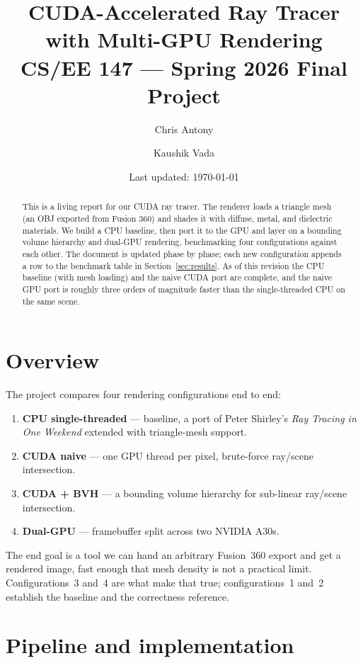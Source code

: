 \documentclass[11pt]{article}
\title{\textbf{CUDA-Accelerated Ray Tracer with Multi-GPU Rendering}\\[4pt]
       \large CS/EE 147 --- Spring 2026 Final Project}
\author{Chris Antony \and Kaushik Vada}
\date{Last updated: \today}
\begin{document}
\maketitle

\begin{abstract}
This is a living report for our CUDA ray tracer. The renderer loads a triangle mesh
(an OBJ exported from Fusion 360) and shades it with diffuse, metal, and dielectric
materials. We build a CPU baseline, then port it to the GPU and layer on a bounding
volume hierarchy and dual-GPU rendering, benchmarking four configurations against
each other. The document is updated phase by phase; each new configuration appends a
row to the benchmark table in Section~\ref{sec:results}. As of this revision the CPU
baseline (with mesh loading) and the naive CUDA port are complete, and the naive GPU
port is roughly three orders of magnitude faster than the single-threaded CPU on the
same scene.
\end{abstract}

\section{Overview}

The project compares four rendering configurations end to end:

\begin{enumerate}
  \item \textbf{CPU single-threaded} --- baseline, a port of Peter Shirley's
        \emph{Ray Tracing in One Weekend} extended with triangle-mesh support.
  \item \textbf{CUDA naive} --- one GPU thread per pixel, brute-force ray/scene
        intersection.
  \item \textbf{CUDA + BVH} --- a bounding volume hierarchy for sub-linear
        ray/scene intersection.
  \item \textbf{Dual-GPU} --- framebuffer split across two NVIDIA A30s.
\end{enumerate}

The end goal is a tool we can hand an arbitrary Fusion~360 export and get a rendered
image, fast enough that mesh density is not a practical limit. Configurations~3 and~4
are what make that true; configurations~1 and~2 establish the baseline and the
correctness reference.

\section{Pipeline and implementation}
\end{document}
